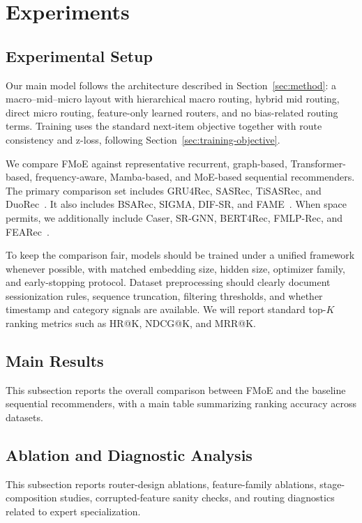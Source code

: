 \documentclass[sigconf,anonymous,review]{acmart}
\begin{document}
\section{Experiments}
\label{sec:experiments}

\subsection{Experimental Setup}
Our main model follows the architecture described in Section~\ref{sec:method}: a macro--mid--micro layout with hierarchical macro routing, hybrid mid routing, direct micro routing, feature-only learned routers, and no bias-related routing terms. Training uses the standard next-item objective together with route consistency and z-loss, following Section~\ref{sec:training-objective}.

We compare FMoE against representative recurrent, graph-based, Transformer-based, frequency-aware, Mamba-based, and MoE-based sequential recommenders. The primary comparison set includes GRU4Rec, SASRec, TiSASRec, and DuoRec~\cite{hidasi2016gru4rec,kang2018sasrec,li2020tisasrec,qiu2022duorec}. It also includes BSARec, SIGMA, DIF-SR, and FAME~\cite{shin2024bsarec,liu2025sigma,xie2022difsr,liu2025fame}. When space permits, we additionally include Caser, SR-GNN, BERT4Rec, FMLP-Rec, and FEARec~\cite{tang2018caser,wu2019srgnn,sun2019bert4rec,zhou2022fmlprec,du2023fearec}.

To keep the comparison fair, models should be trained under a unified framework whenever possible, with matched embedding size, hidden size, optimizer family, and early-stopping protocol. Dataset preprocessing should clearly document sessionization rules, sequence truncation, filtering thresholds, and whether timestamp and category signals are available. We will report standard top-$K$ ranking metrics such as HR@K, NDCG@K, and MRR@K.

\subsection{Main Results}
This subsection reports the overall comparison between FMoE and the baseline sequential recommenders, with a main table summarizing ranking accuracy across datasets.

\subsection{Ablation and Diagnostic Analysis}
This subsection reports router-design ablations, feature-family ablations, stage-composition studies, corrupted-feature sanity checks, and routing diagnostics related to expert specialization.
\end{document}
